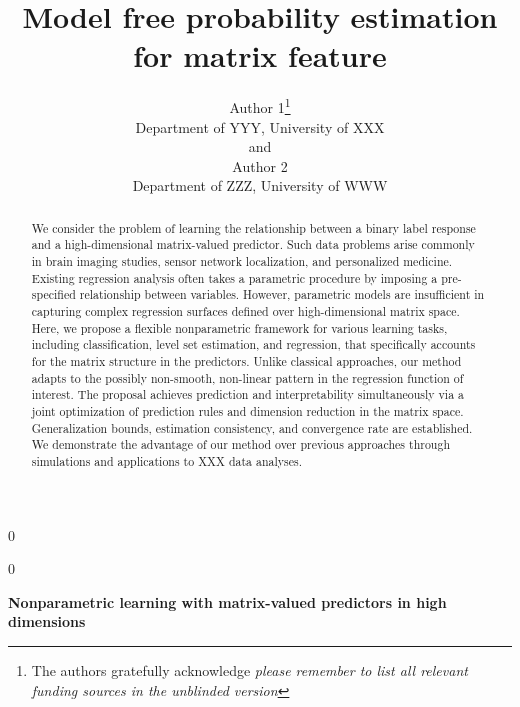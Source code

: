 \documentclass[12pt]{article}
\newcommand{\blind}{0}
\begin{document}
%

\def\spacingset#1{\renewcommand{\baselinestretch}%
{#1}\small\normalsize} \spacingset{1}



\blind
{
  \title{\bf Model free probability estimation for matrix feature}
  \author{Author 1\thanks{
    The authors gratefully acknowledge \textit{please remember to list all relevant funding sources in the unblinded version}}\hspace{.2cm}\\
    Department of YYY, University of XXX\\
    and \\
    Author 2 \\
    Department of ZZZ, University of WWW}
  \maketitle
} \fi

\blind
{
  \bigskip
  \bigskip
  \bigskip
  \begin{center}
    {\LARGE\bf Nonparametric learning with matrix-valued predictors in high dimensions}
\end{center}
  \medskip
} \fi

\bigskip
\begin{abstract}
We consider the problem of learning the relationship between a binary label response and a high-dimensional matrix-valued predictor. Such data problems arise commonly in brain imaging studies, sensor network localization, and personalized medicine. Existing regression analysis often takes a parametric procedure by imposing a pre-specified relationship between variables. However, parametric models are insufficient in capturing complex regression surfaces defined over high-dimensional matrix space. Here, we propose a flexible nonparametric framework for various learning tasks, including classification, level set estimation, and regression, that specifically accounts for the matrix structure in the predictors. Unlike classical approaches, our method adapts to the possibly non-smooth, non-linear pattern in the regression function of interest. The proposal achieves prediction and interpretability simultaneously via a joint optimization of prediction rules and dimension reduction in the matrix space. Generalization bounds, estimation consistency, and convergence rate are established. We demonstrate the advantage of our method over previous approaches through simulations and applications to  {\color{red}XXX} data analyses. 

\end{abstract}
\end{document}
